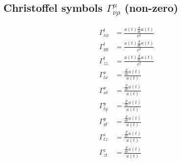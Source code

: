 \documentclass{article}
\begin{document}
\subsection{Christoffel symbols $\Gamma^{\mu}_{\nu\rho}$ (non-zero)}
\begin{align}
\Gamma^{t}_{x x} &= \frac{a{\left(t \right)} \frac{d}{d t} a{\left(t \right)}}{c^{2}} \\ 
\Gamma^{t}_{y y} &= \frac{a{\left(t \right)} \frac{d}{d t} a{\left(t \right)}}{c^{2}} \\ 
\Gamma^{t}_{z z} &= \frac{a{\left(t \right)} \frac{d}{d t} a{\left(t \right)}}{c^{2}} \\ 
\Gamma^{x}_{t x} &= \frac{\frac{d}{d t} a{\left(t \right)}}{a{\left(t \right)}} \\ 
\Gamma^{x}_{x t} &= \frac{\frac{d}{d t} a{\left(t \right)}}{a{\left(t \right)}} \\ 
\Gamma^{y}_{t y} &= \frac{\frac{d}{d t} a{\left(t \right)}}{a{\left(t \right)}} \\ 
\Gamma^{y}_{y t} &= \frac{\frac{d}{d t} a{\left(t \right)}}{a{\left(t \right)}} \\ 
\Gamma^{z}_{t z} &= \frac{\frac{d}{d t} a{\left(t \right)}}{a{\left(t \right)}} \\ 
\Gamma^{z}_{z t} &= \frac{\frac{d}{d t} a{\left(t \right)}}{a{\left(t \right)}} \\ 
\end{align}
\end{document}
